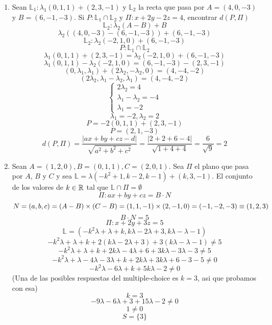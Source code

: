 \documentclass[../practica.root.tex]{subfiles}
\begin{document}
\begin{enumerate}
    \item Sean \(\mathbb{L}_1 : \lambda_1(0,1,1)+(2,3,-1)\) y \(\mathbb{L}_2\) la recta que pasa por \(A = (4,0,-3)\) y \(B = (6,-1,-3)\). Si \(P : \mathbb{L}_1 \cap \mathbb{L}_2\) y \(\Pi : x + 2y - 2z = 4\), encontrar \(d(P,\Pi)\)
          \[ \mathbb{L}_2 : \lambda_2(A-B) + B \]
          \[ \lambda_2((4,0,-3)-(6,-1,-3))+(6,-1,-3) \]
          \[ \mathbb{L}_2 : \lambda_2(-2,1,0)+(6,-1,-3) \]
          \[ P : \mathbb{L}_1 \cap \mathbb{L}_2 \]
          \[ \lambda_1(0,1,1)+(2,3,-1) = \lambda_2(-2,1,0)+(6,-1,-3) \]
          \[ \lambda_1(0,1,1)-\lambda_2(-2,1,0) = (6,-1,-3)-(2,3,-1) \]
          \[ (0,\lambda_1,\lambda_1)+(2\lambda_2,-\lambda_2,0) = (4,-4,-2) \]
          \[ (2\lambda_2,\lambda_1-\lambda_2,\lambda_1) = (4,-4,-2) \]
          \[
              \begin{cases}
                  2\lambda_2 = 4             \\
                  \lambda_1 - \lambda_2 = -4 \\
                  \lambda_1 = -2
              \end{cases}
          \] \[
              \lambda_1 = -2, \lambda_2 = 2
          \]
          \[ P = -2(0,1,1)+(2,3,-1) \]
          \[ P = (2,1,-3) \]
          \[
              d(P,\Pi) = \frac{
                  |ax + by + cz - d|
              }{
                  \sqrt{a^2 + b^2 + c^2}
              } = \frac{
                  |2 + 2 + 6 - 4|
              }{
                  \sqrt{1 + 4 + 4}
              } = \frac{6}{\sqrt{9}} = \boxed{2}
          \]


    \item Sean \(A = (1,2,0), B = (0,1,1), C = (2,0,1)\). Sea \(\Pi\) el plano que pasa por \(A\), \(B\) y \(C\) y sea \(\mathbb{L} = \lambda(-k^2 + 1, k - 2, k - 1) + (k, 3, -1)\). El conjunto de los valores de \(k \in \mathbb{R}\) tal que \(\mathbb{L}\cap\Pi = \emptyset\)
          \[ \Pi: ax + by + cz = B\cdot N \]
          \[ N = (a,b,c) = (A-B)\times(C-B) = (1,1,-1)\times(2,-1,0) = (-1,-2,-3) \equiv (1,2,3) \]
          \[ B\cdot N = 5 \]
          \[ \Pi: x + 2y + 3z = 5 \]
          \[ \mathbb{L} = (-k^2\lambda + \lambda + k, k\lambda - 2\lambda + 3, k\lambda - \lambda - 1)  \]
          \[ -k^2\lambda + \lambda + k + 2(k\lambda - 2\lambda + 3) + 3(k\lambda - \lambda - 1) \neq 5 \]
          \[ -k^2\lambda + \lambda + k + 2k\lambda - 4\lambda + 6 + 3k\lambda - 3\lambda - 3 \neq 5 \]
          \[ -k^2\lambda + \lambda - 4\lambda - 3\lambda + k + 2k\lambda + 3k\lambda + 6 - 3 - 5 \neq 0 \]
          \[ -k^2\lambda - 6\lambda + k + 5k\lambda -2 \neq 0 \]
          (Una de las posibles respuestas del multiple-choice es \(k = 3\), asi que probamos con esa)
          \[ k = 3 \]
          \[ -9\lambda - 6\lambda + 3 + 15\lambda -2 \neq 0 \]
          \[ 1 \neq 0 \]
          \[ \boxed{S = \{3\}} \]



\end{enumerate}
\end{document}
